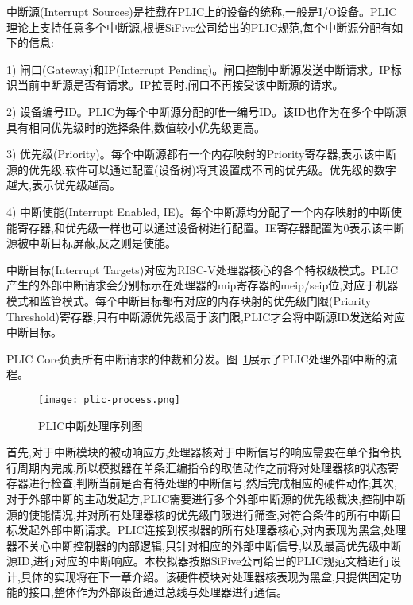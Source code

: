 中断源(Interrupt Sources)是挂载在PLIC上的设备的统称,一般是I/O设备。PLIC理论上支持任意多个中断源,根据SiFive公司给出的PLIC规范,每个中断源分配有如下的信息:


1) 闸口(Gateway)和IP(Interrupt Pending)。闸口控制中断源发送中断请求。IP标识当前中断源是否有请求。IP拉高时,闸口不再接受该中断源的请求。


2) 设备编号ID。PLIC为每个中断源分配的唯一编号ID。该ID也作为在多个中断源具有相同优先级时的选择条件,数值较小优先级更高。


3) 优先级(Priority)。每个中断源都有一个内存映射的Priority寄存器,表示该中断源的优先级,软件可以通过配置(设备树)将其设置成不同的优先级。优先级的数字越大,表示优先级越高。


4) 中断使能(Interrupt Enabled, IE)。每个中断源均分配了一个内存映射的中断使能寄存器,和优先级一样也可以通过设备树进行配置。IE寄存器配置为0表示该中断源被中断目标屏蔽,反之则是使能。


中断目标(Interrupt Targets)对应为RISC-V处理器核心的各个特权级模式。PLIC产生的外部中断请求会分别标示在处理器的mip寄存器的meip/seip位,对应于机器模式和监管模式。每个中断目标都有对应的内存映射的优先级门限(Priority Threshold)寄存器,只有中断源优先级高于该门限,PLIC才会将中断源ID发送给对应中断目标。


PLIC Core负责所有中断请求的仲裁和分发。图~\ref{fig:plic-process}展示了PLIC处理外部中断的流程。
\begin{figure}[h]
    \centering
    \texttt{[image: plic-process.png]}
    \caption{PLIC中断处理序列图}
    \label{fig:plic-process}
\end{figure}

首先,对于中断模块的被动响应方,处理器核对于中断信号的响应需要在单个指令执行周期内完成,所以模拟器在单条汇编指令的取值动作之前将对处理器核的状态寄存器进行检查,判断当前是否有待处理的中断信号,然后完成相应的硬件动作;其次,对于外部中断的主动发起方,PLIC需要进行多个外部中断源的优先级裁决,控制中断源的使能情况,并对所有处理器核的优先级门限进行筛查,对符合条件的所有中断目标发起外部中断请求。PLIC连接到模拟器的所有处理器核心,对内表现为黑盒,处理器不关心中断控制器的内部逻辑,只针对相应的外部中断信号,以及最高优先级中断源ID,进行对应的中断响应。本模拟器按照SiFive公司给出的PLIC规范文档进行设计,具体的实现将在下一章介绍。该硬件模块对处理器核表现为黑盒,只提供固定功能的接口,整体作为外部设备通过总线与处理器进行通信。

